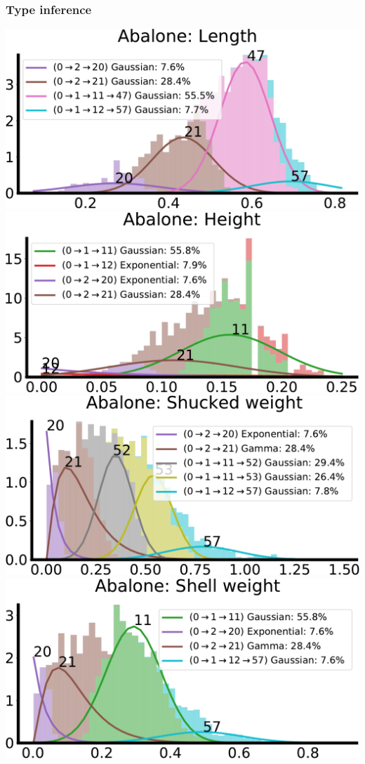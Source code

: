 \documentclass[xcolor={usenames,dvipsnames,svgnames}, compress, aspectratio=169, 11pt]{beamer}
\begin{document}
\begin{frame}[t, htt=bgrey2]
  \frametitle{Type inference}

  \large
  \begin{minipage}[t]{0.9\linewidth}
    \includegraphics[width=0.45\columnwidth]{figures/d1-fit-crop.pdf}
    \includegraphics[width=0.45\columnwidth]{figures/d3-fit-crop.pdf}\\
    \includegraphics[width=0.45\columnwidth]{figures/d5-fit-crop.pdf}
    \includegraphics[width=0.45\columnwidth]{figures/d7-fit-crop.pdf}
  \end{minipage}\hfill\begin{minipage}[t]{0.3\linewidth}
    \vspace{-150pt}
    
  \end{minipage}\hfill\begin{minipage}[t]{0.3\linewidth}
    \vspace{-150pt}
    
  \end{minipage}
  
\end{frame}
\end{document}
